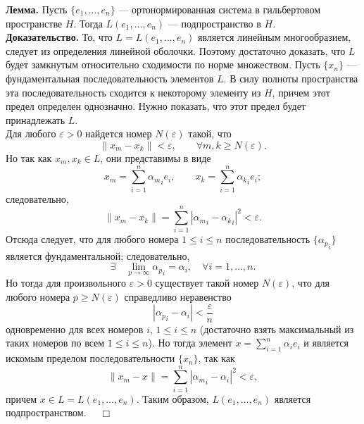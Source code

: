 \documentclass[12pt,a4paper, titlepage]{article}
\begin{document}
\textbf{Лемма.} Пусть $\{e_1, \ldots ,e_n\}$ --- ортонормированная система в гильбертовом пространстве $H$. Тогда
$L(e_1, \ldots, e_n)$ --- подпространство в $H$.\\
\textbf{Доказательство.} То, что $L = L(e_1, \ldots, e_n)$ является линейным многообразием, следует из определения линейной оболочки. Поэтому достаточно доказать, что $L$ будет замкнутым относительно сходимости по норме множеством.
Пусть $\{x_n\}$ --- фундаментальная последовательность элементов $L$. В силу полноты пространства эта последовательность сходится к некоторому элементу из $H$, причем этот предел определен однозначно. Нужно показать, что этот предел будет принадлежать $L$.\\

Для любого $\varepsilon > 0$ найдется номер $N(\varepsilon)$ такой, что 
$$
\|x_m - x_k\| < \varepsilon, \qquad \forall m, k \geqslant N(\varepsilon). 
$$ 
Но так как $x_m, x_k \in L$, они представимы в виде
$$
x_m = \sum_{i=1}^n {{\alpha}_m}_i e_i, \qquad x_k = \sum_{i=1}^n {{\alpha}_k}_i e_i;
$$
следовательно,
$$
\|x_m - x_k\| = \sum_{i=1}^n |{{\alpha}_m}_i - {{\alpha}_k}_i|^2 < \varepsilon.
$$
Отсюда следует, что для любого номера $1 \leqslant i \leqslant n$ последовательность $\{{{\alpha}_p}_i\}$ является фундаментальной; следовательно,
$$
\exists \quad \lim_{p \to \infty} {{\alpha}_p}_i = {\alpha}_i, \quad \forall i = 1,\ldots, n.
$$ 
Но тогда для произвольного $\varepsilon > 0$ существует такой номер $N(\varepsilon)$, что для любого номера $p \geqslant N(\varepsilon)$ справедливо неравенство
$$
|{{\alpha}_p}_i - {\alpha}_i| < \frac{\varepsilon}{n}
$$
одновременно для всех номеров $i$, $1 \leqslant i \leqslant n$ (достаточно взять максимальный из таких номеров по всем $1 \leqslant i \leqslant n$). Но тогда элемент $x = \sum\limits_{i=1}^n {\alpha}_i e_i$ и является искомым пределом последовательности $\{x_n\}$, так как
$$
\|x_m - x\| = \sum_{i=1}^n |{{\alpha}_m}_i - {\alpha}_i|^2 < \varepsilon,
$$
причем $x \in L = L(e_1, \ldots, e_n)$. Таким образом, $L(e_1, \ldots, e_n)$ является подпространством. $\quad \Box$\\
\end{document}
